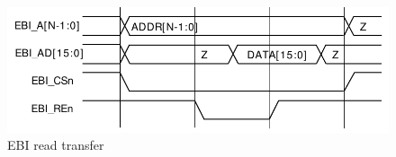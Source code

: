 \begin{figure}[h]
	\centering
	\includegraphics[width=0.8\linewidth]{figures/fpga/ebi_read.png}
	\caption{EBI read transfer\cite[p.7]{efm_ebi}}
	\label{fig:ebi_read}
\end{figure}

